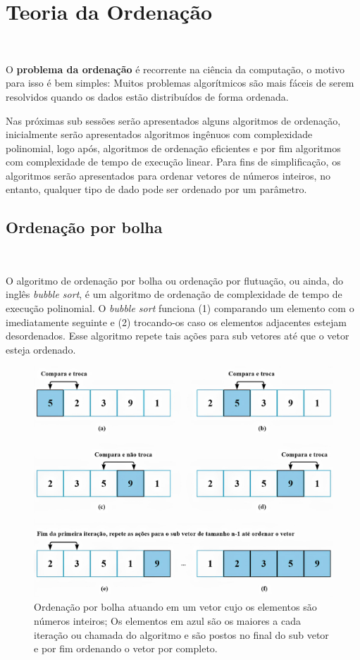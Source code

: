 \section{Teoria da Ordenação}
\

O \textbf{problema da ordenação} é recorrente na ciência da computação, o motivo para isso é bem simples: Muitos problemas algorítmicos são mais fáceis de serem resolvidos quando os dados estão distribuídos de forma ordenada.

Nas próximas sub sessões serão apresentados alguns algoritmos de ordenação, inicialmente serão apresentados algoritmos ingênuos com complexidade polinomial, logo após, algoritmos de ordenação eficientes e por fim algoritmos com complexidade de tempo de execução linear. Para fins de simplificação, os algoritmos serão apresentados para ordenar vetores de números inteiros, no entanto, qualquer tipo de dado pode ser ordenado por um parâmetro. 

\subsection{Ordenação por bolha}
\

O algoritmo de ordenação por bolha ou ordenação por flutuação, ou ainda, do inglês \textit{bubble sort}, é um algoritmo de ordenação de complexidade de tempo de execução polinomial. O \textit{bubble sort} funciona (1) comparando um elemento com o imediatamente seguinte e (2) trocando-os caso os elementos adjacentes estejam desordenados. Esse algoritmo repete tais ações para sub vetores até que o vetor esteja ordenado.

\begin{figure}[h]
  \centering
  \includegraphics[width=.9\linewidth]{img/bubblesort.jpg}
  \caption{Ordenação por bolha atuando em um vetor cujo os elementos são números inteiros; Os elementos em azul são os maiores a cada iteração ou chamada do algoritmo e são postos no final do sub vetor e por fim ordenando o vetor por completo.}
  \label{bubblesort}
\end{figure}

